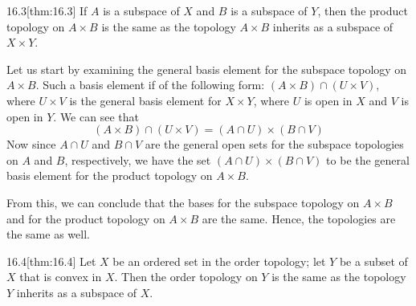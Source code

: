 \begin{thmBox}{16.3}[thm:16.3]
    If \( A \) is a subspace of \( X \) and \( B \) is a subspace of \( Y \),
    then the product topology on \( A \times B \) is the same as the topology
    \( A \times B \) inherits as a subspace of \( X \times Y \).

    \baseRule

    \begin{proofBox}
        Let us start by examining the general basis element for the subspace
        topology on \( A \times B \).
        Such a basis element if of the following form: \( ( A \times B ) \cap 
        ( U \times V ) \), where \( U \times V \) is the general basis element
        for \( X \times Y \), where \( U \) is open in \( X \) and \( V \) is
        open in \( Y \).
        We can see that 
        \begin{equation*}
            ( A \times B ) \cap ( U \times V )
            =
            ( A \cap U ) \times ( B \cap V )
        \end{equation*}
        Now since \( A \cap U \) and \( B \cap V \) are the general open sets
        for the subspace topologies on \( A \) and \( B \), respectively, 
        we have the set \( ( A \cap U ) \times ( B \cap V ) \) to be the
        general basis element for the product topology on \( A \times B \).

        \baseSkip

        From this, we can conclude that the bases for the subspace topology on
        \( A \times B \) and for the product topology on \( A \times B \) are 
        the same.
        Hence, the topologies are the same as well.
    \end{proofBox}
\end{thmBox}

\begin{thmBox}{16.4}[thm:16.4]
    Let \( X \) be an ordered set in the order topology; 
    let \( Y \) be a subset of \( X \) that is convex in \( X \).
    Then the order topology on \( Y \) is the same as the topology \( Y \) 
    inherits as a subspace of \( X \).

    \baseRule

    \begin{proofBox}

    \end{proofBox}
\end{thmBox}

